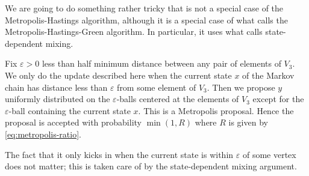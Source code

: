 \documentclass[11pt]{article}
\begin{document}
We are going to do something rather tricky that is not a special case
of the Metropolis-Hastings algorithm, although it is a special case
of what \citet{geyer-intro} calls the Metropolis-Hastings-Green algorithm.
In particular, it uses what \citet[Section~1.17.1]{geyer-intro} calls
state-dependent mixing.

Fix $\varepsilon > 0$ less than half minimum distance between any pair of
elements of $V_3$.  We only do the update described here when the
current state $x$ of the Markov chain has distance less than $\varepsilon$
from some element of $V_3$.  Then we propose $y$ uniformly
distributed on the $\varepsilon$-balls centered at the elements of $V_3$
except for the $\varepsilon$-ball containing the current state $x$.
This is a Metropolis proposal. Hence the proposal is accepted with
probability $\min(1, R)$ where $R$ is given by \eqref{eq:metropolis-ratio}.

The fact that it only kicks in when the current state is within $\varepsilon$
of some vertex does not matter; this is taken care of by the state-dependent
mixing argument.
\end{document}
